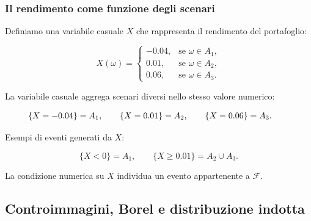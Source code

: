 \documentclass[handout]{beamer}%
\providecommand{\F}{\mathcal{F}}
\providecommand{\1}{\mathbf{1}}
\providecommand{\QTR}[2]{\csname #1\endcsname{#2}}
\begin{document}
\begin{frame}%
%

\frametitle{Il rendimento come funzione degli scenari}%


Definiamo una variabile casuale $X$ che rappresenta il rendimento del portafoglio:%

\[
X(\omega)=
\begin{cases}
-0.04, & \mbox{se } \omega\in A_{1},\\
0.01, & \mbox{se } \omega\in A_{2},\\
0.06, & \mbox{se } \omega\in A_{3}.
\end{cases}
\]


\medskip

La variabile casuale aggrega scenari diversi nello stesso valore numerico:%

\[%
\begin{array}
[c]{rcl}%
\{X=-0.04\} = A_{1}, \qquad\{X=0.01\} = A_{2},\qquad\{X=0.06\} = A_{3}. &  &
\end{array}
\]


\medskip

Esempi di eventi generati da $X$:%

\[
\{X<0\}=A_{1}, \qquad\{X\geq0.01\}=A_{2}\cup A_{3}.
\]


\medskip

La condizione numerica su $X$ individua un evento appartenente a $\F$.%

\transboxout
\end{frame}%




\subsection{Controimmagini, Borel e distribuzione indotta}%
\end{document}
